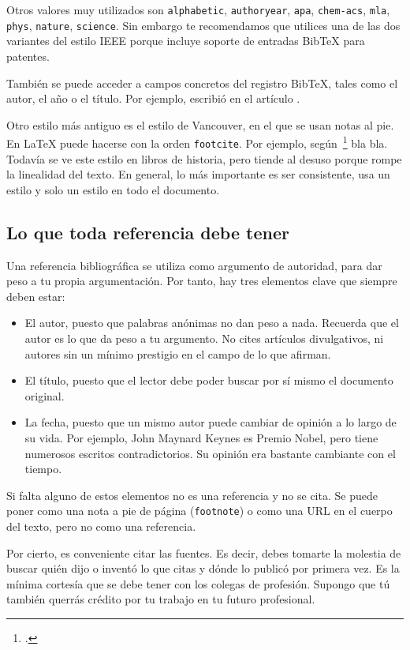 Otros valores muy utilizados son \texttt{alphabetic}, \texttt{authoryear}, \texttt{apa}, \texttt{chem-acs}, \texttt{mla}, \texttt{phys}, \texttt{nature}, \texttt{science}.  Sin embargo te recomendamos que utilices una de las dos variantes del estilo IEEE porque incluye soporte de entradas BibTeX para patentes.

También se puede acceder a campos concretos del registro BibTeX, tales como el autor, el año o el título.  Por ejemplo, \citeauthor{dosovitskiy2021vit} escribió en \citeyear{dosovitskiy2021vit} el artículo .

Otro estilo más antiguo es el estilo de Vancouver, en el que se usan notas al pie.  En \LaTeX{} puede hacerse con la orden \texttt{footcite}.  Por ejemplo, según~\footcite[3]{dosovitskiy2021vit} bla bla.  Todavía se ve este estilo en libros de historia, pero tiende al desuso porque rompe la linealidad del texto. En general, lo más importante es ser consistente, usa un estilo y solo un estilo en todo el documento.

\subsection{Lo que toda referencia debe tener}

Una referencia bibliográfica se utiliza como argumento de autoridad, para dar peso a tu propia argumentación.  Por tanto, hay tres elementos clave que siempre deben estar: 
\begin{itemize}
    \item El autor, puesto que palabras anónimas no dan peso a nada.  Recuerda que el autor es lo que da peso a tu argumento.  No cites artículos divulgativos, ni autores sin un mínimo prestigio en el campo de lo que afirman.
    \item El título, puesto que el lector debe poder buscar por sí mismo el documento original.
    \item La fecha, puesto que un mismo autor puede cambiar de opinión a lo largo de su vida.  Por ejemplo,  John Maynard Keynes es Premio Nobel, pero tiene numerosos escritos contradictorios.  Su opinión era bastante cambiante con el tiempo.
\end{itemize}

Si falta alguno de estos elementos no es una referencia y no se cita.  Se puede poner como una nota a pie de página (\texttt{footnote}) o como una URL en el cuerpo del texto, pero no como una referencia.

Por cierto, es conveniente citar las fuentes.  Es decir, debes tomarte la molestia de buscar quién dijo o inventó lo que citas y dónde lo publicó por primera vez.  Es la mínima cortesía que se debe tener con los colegas de profesión.  Supongo que tú también querrás crédito por tu trabajo en tu futuro profesional.
